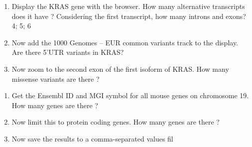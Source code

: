 \documentclass[11pt]{article}
\begin{document}
\begin{enumerate}
	\item Display the KRAS gene with the browser. How many alternative transcripts does it have ? Considering the first transcript, how many introns and exons? 4; 5; 6
	\item Now add the 1000 Genomes – EUR common variants track to the display. Are there 5'UTR variants in KRAS? 
	\item Now zoom to the second exon of the first isoform of KRAS. How many missense variants are there ?
\end{enumerate}

\begin{enumerate}
	\item Get the Ensembl ID and MGI symbol for all mouse genes on chromosome 19. How many genes are there ?  
	\item Now limit this to protein coding genes. How many genes are there ? 
	\item Now save the results to a comma-separated values fil
\end{enumerate}
\end{document}
